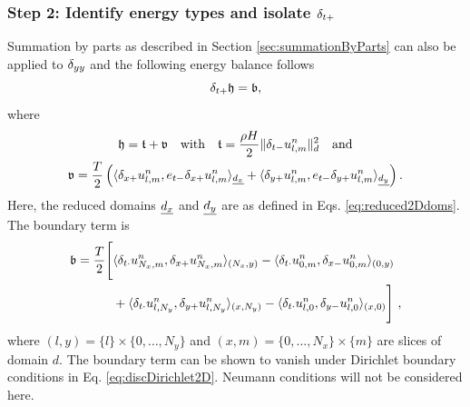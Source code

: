 \subsubsection{Step 2: Identify energy types and isolate $\delta_{t+}$}
Summation by parts as described in Section \ref{sec:summationByParts} can also be applied to $\delta_{yy}$ and the following energy balance follows 
\begin{equation*}
    \delta_{t+} \mathfrak{h} = \mathfrak{b},
\end{equation*}
where 
\begin{equation}\label{eq:energyBalance2DWave}
    \begin{gathered}
        \mathfrak{h} = \mathfrak{t} + \mathfrak{v} \quad \text{with} \quad \mathfrak{t} = \frac{\rho H}{2}\lVert \delta_{t-} u_{l,m}^n\rVert^2_d \quad \text{and}
        \\
        \mathfrak{v} = \frac{T}{2} \left(\langle \delta_{x+} u_{l,m}^n, e_{t-}\delta_{x+} u_{l,m}^n\rangle_{\underline{d_x}} + \langle \delta_{y+} u_{l,m}^n, e_{t-}\delta_{y+} u_{l,m}^n\rangle_{\underline{d_y}} \right).
    \end{gathered}
\end{equation}
Here, the reduced domains $\underline{d_x}$ and $\underline{d_y}$ are as defined in Eqs. \eqref{eq:reduced2Ddoms}. The boundary term is 
\begin{equation*}
    \begin{aligned}
    \mathfrak{b} =\frac{T}{2}\Bigg[&\langle \delta_{t\cdot} u_{N_x,m}^n, \delta_{x+} u_{N_x,m}^n \rangle_{(N_x, y)} -\langle \delta_{t\cdot} u_{0,m}^n, \delta_{x-} u_{0,m}^n \rangle_{(0, y)}\\
    &+ \langle \delta_{t\cdot} u_{l,N_y}^n, \delta_{y+} u_{l,N_y}^n \rangle_{(x, N_y)} - \langle \delta_{t\cdot} u_{l,0}^n, \delta_{y-} u_{l,0}^n \rangle_{(x, 0)}\Bigg]\ ,
    \end{aligned}
\end{equation*}
where $(l,y) = \{l\}\times\{0, \hdots, N_y\}$ and $(x,m) = \{0, \hdots,  N_x\}\times\{m\}$ are slices of domain $d$. The boundary term can be shown to vanish under Dirichlet boundary conditions in Eq. \eqref{eq:discDirichlet2D}. Neumann conditions will not be considered here.

